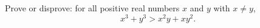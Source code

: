 Prove or disprove: for all positive real numbers $x$ and $y$ with $x\ne y$,
\[x^3+y^3>x^2y+xy^2 .\]
